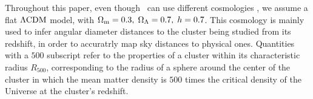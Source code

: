 \textcolor{lightgray}{\lipsum[2]}

Throughout this paper, even though \panco\ can use different cosmologies , we assume a flat $\Lambda {\rm CDM}$ model, with $\Omega_{\rm m} = 0.3, \;\Omega_\Lambda = 0.7, \; h = 0.7$.
This cosmology is mainly used to infer angular diameter distances to the cluster being studied from its redshift, in order to accuratrly map sky distances to physical ones.
Quantities with a $500$ subscript refer to the properties of a cluster within its characteristic radius $R_{500}$, corresponding to the radius of a sphere around the center of the cluster in which the mean matter density is $500$ times the critical density of the Universe at the cluster's redshift.
